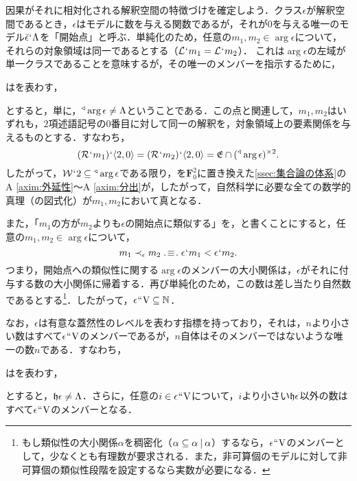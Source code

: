 因果がそれに相対化される解釈空間の特徴づけを確定しよう．クラス$\epsilon$が解釈空間であるとき，$\epsilon$はモデルに数を与える関数であるが，それが$0$を与える唯一のモデル$\breve{\epsilon}{\mspace{1mu}{`}\mspace{1mu}} \Lambda$を「開始点」と呼ぶ．単純化のため，任意の$m_1,m_2\in\arg\epsilon$について，それらの対象領域は同一であるとする（$\mathcal{L}{\mspace{1mu}{`}\mspace{1mu}} m_1 = \mathcal{L}{\mspace{1mu}{`}\mspace{1mu}} m_2$）．
これは$\arg\epsilon$の左域が単一クラスであることを意味するが，その唯一のメンバーを指示するために，
\begin{df}
\label{df:トライアングル}
\kagi{$
    \trgl{\alpha}
$}はを表わす，
\end{df}
\noindent とすると，単に，$ {^\triangleleft}\arg\epsilon\neq \Lambda $ということである．この点と関連して，$m_1,m_2$はいずれも，$2$項述語記号の$0$番目に対して同一の解釈を，対象領域上の要素関係を与えるものとする．すなわち，
\[
    (\mathcal{R}{\mspace{1mu}{`}\mspace{1mu}} m_1){\mspace{1mu}{`}\mspace{1mu}} \langle 2,0 \rangle = (\mathcal{R}{\mspace{1mu}{`}\mspace{1mu}} m_2){\mspace{1mu}{`}\mspace{1mu}} \langle 2,0 \rangle = \mathfrak{E}\cap({^\triangleleft}\arg\epsilon)^{\times 2}.
\]
したがって，$ \mathcal{W}{\mspace{1mu}{`}\mspace{1mu}} 2\subseteq{^\triangleleft}\arg\epsilon $である限り，\kagi{$ \in $}を$ \mathbf{F}^2_0 $に置き換えた\ref{ssec:集合論の体系}のA \ref{axim:外延性}〜A \ref{axim:分出}が，したがって，自然科学に必要な全ての数学的真理（の図式化）が$m_1,m_2$において真となる．

また，「$m_1$の方が$m_2$よりも$\epsilon$の開始点に類似する」を，と書くことにすると，任意の$m_1,m_2\in\arg\epsilon$について，
\[
   m_1 \prec_{\epsilon} m_2 \case{3}{1}{1} \epsilon\fap m_1 < \epsilon\fap m_2.
\]
つまり，開始点への類似性に関する$\arg\epsilon$のメンバーの大小関係は，$\epsilon$がそれに付与する数の大小関係に帰着する．再び単純化のため，この数は差し当たり自然数であるとする\footnote{
    もし類似性の大小関係$\alpha$を稠密化（$\alpha\subseteq\alpha\mathbin{\mid}\alpha$）するなら，$\epsilon{\mspace{1mu}{``}\mspace{1mu}}\mathrm{V}$のメンバーとして，少なくとも有理数が要求される．また，非可算個のモデルに対して非可算個の類似性段階を設定するなら実数が必要になる．
}．したがって，$\epsilon{\mspace{1mu}{``}\mspace{1mu}}\mathrm{V}\subseteq\mathbb{N}$．

なお，$\epsilon$は有意な蓋然性のレベルを表わす指標を持っており，それは，$n$より小さい数はすべて$\epsilon{\mspace{1mu}{``}\mspace{1mu}}\mathrm{V}$のメンバーであるが，$n$自体はそのメンバーではないような唯一の数$n$である．すなわち，
\begin{df}
\label{df:有意指標}
\kagi{$
    \indx{\epsilon}
$}はを表わす，
\end{df}
\noindent とすると，$\mathfrak{h}\epsilon\neq \Lambda$．さらに，任意の$i\in\epsilon{\mspace{1mu}{``}\mspace{1mu}}\mathrm{V}$について，$i$より小さい$\indx{\epsilon}$以外の数はすべて$\epsilon{\mspace{1mu}{``}\mspace{1mu}}\mathrm{V}$のメンバーとなる．

